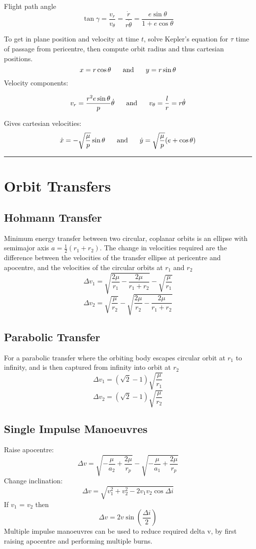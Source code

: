 \documentclass[table,cmyk,fleqn]{article}
\begin{document}
\begin{longtable}
Flight path angle
\[\tan \gamma = \frac{v_r}{v_\theta}=\frac{\dot{r}}{r\dot{\theta}}=\frac{e\sin \theta}{1+e \cos \theta}\]

To get in plane position and velocity at time $t$, solve Kepler's equation for $\tau$ time of passage from pericentre, then compute orbit radius and thus cartesian positions.
\[x = r\cos \theta \text{\hspace{0.6cm}and\hspace{0.6cm}} y = r\sin \theta\]
Velocity components:
\begin{boldmath}\[v_r = \frac{r^2e\sin \theta}{p}\dot{\theta}\text{\hspace{0.6cm}and\hspace{0.6cm}}v_\theta = \frac{l}{r} = r\dot{\theta}\]\end{boldmath}
Gives cartesian velocities:
\[\dot{x} = -\sqrt{\frac{\mu}{p}}\sin \theta \text{\hspace{0.6cm}and\hspace{0.6cm}}\dot{y} = \sqrt{\frac{\mu}{p}}(e+\cos \theta)\]
\noindent\rule{9cm}{0.4pt}
\section*{Orbit Transfers}
\subsection*{Hohmann Transfer}
Minimum energy transfer between two circular, coplanar orbits is an ellipse with semimajor axis $a = \frac{1}{2}(r_1 + r_2)$. The change in velocities required are the difference between the velocities of the transfer ellipse at pericentre and apocentre, and the velocities of the circular orbits at $r_1$ and $r_2$
\[\Delta v_1 = \sqrt{\frac{2\mu}{r_1}-\frac{2\mu}{r_1+r_2}}-\sqrt{\frac{\mu}{r_1}}\]
\[\Delta v_2 = \sqrt{\frac{\mu}{r_2}}-\sqrt{\frac{2\mu}{r_2}-\frac{2\mu}{r_1+r_2}}\]
\subsection*{Parabolic Transfer}
For a parabolic transfer where the orbiting body escapes circular orbit at $r_1$ to infinity, and is then captured from infinity into orbit at $r_2$
\[\Delta v_1 = (\sqrt{2}-1)\sqrt{\frac{\mu}{r_1}}\]
\[\Delta v_2 = (\sqrt{2}-1)\sqrt{\frac{\mu}{r_2}}\]
\subsection*{Single Impulse Manoeuvres}
Raise apocentre:
\[\Delta v = \sqrt{-\frac{\mu}{a_2}+\frac{2\mu}{r_p}}-\sqrt{-\frac{\mu}{a_1}+\frac{2\mu}{r_p}}\]
\tabularnewline\hline
Change inclination:
\[\Delta v = \sqrt{v_1^2+v_2^2-2v_1v_2\cos \Delta i}\]
If $v_1$ = $v_2$ then
\[\Delta v = 2v\sin \left( \frac{\Delta i}{2}\right)\]
Multiple impulse manoeuvres can be used to reduce required delta v, by first raising apocentre and performing multiple burns.


\end{longtable}
\end{document}
